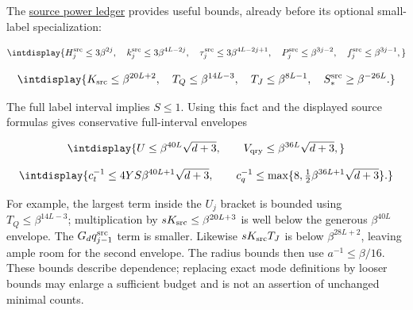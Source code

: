 
The \hyperref[int:source-power-ledger]{source power ledger} provides useful bounds, already before its optional small-label specialization:


\begingroup\renewcommand{\theHequation}{intdisplay.280}
\begin{equation*}
\intdisplay{
H_j^{\rm src}\le3\beta^{2j},\quad
k_j^{\rm src}\le3\beta^{4L-2j},\quad
\tau_j^{\rm src}\le3\beta^{4L-2j+1},\quad
P_j^{\rm src}\le\beta^{3j-2},\quad f_j^{\rm src}\le\beta^{3j-1},
}
\end{equation*}
\endgroup

\begingroup\renewcommand{\theHequation}{intdisplay.281}
\begin{equation*}
\intdisplay{
K_{\rm src}\le\beta^{20L+2},\quad
T_Q\le\beta^{14L-3},\quad T_J\le\beta^{8L-1},\quad
S_*^{\rm src}\ge\beta^{-26L}.
}
\end{equation*}
\endgroup


The full label interval implies \(S\le1\). Using this fact and the displayed source formulas gives conservative full-interval envelopes


\begingroup\renewcommand{\theHequation}{intdisplay.282}
\begin{equation*}
\intdisplay{
U\le\beta^{40L}\sqrt{d+3},\qquad
V_{\rm qry}\le\beta^{36L}\sqrt{d+3},
}
\end{equation*}
\endgroup

\begingroup\renewcommand{\theHequation}{intdisplay.283}
\begin{equation*}
\intdisplay{
c_t^{-1}\le4YS\beta^{40L+1}\sqrt{d+3},\qquad
c_q^{-1}\le\max\{8,\tfrac12\beta^{36L+1}\sqrt{d+3}\}.
}
\end{equation*}
\endgroup


For example, the largest term inside the \(U_j\) bracket is bounded using \(T_Q\le\beta^{14L-3}\); multiplication by \(sK_{\rm src}\le\beta^{20L+3}\) is well below the generous \(\beta^{40L}\) envelope. The \(G_dq_{j-1}^{\rm src}\) term is smaller. Likewise \(sK_{\rm src}T_J\) is below \(\beta^{28L+2}\), leaving ample room for the second envelope. The radius bounds then use \(a^{-1}\le\beta/16\). These bounds describe dependence; replacing exact mode definitions by looser bounds may enlarge a sufficient budget and is not an assertion of unchanged minimal counts.


